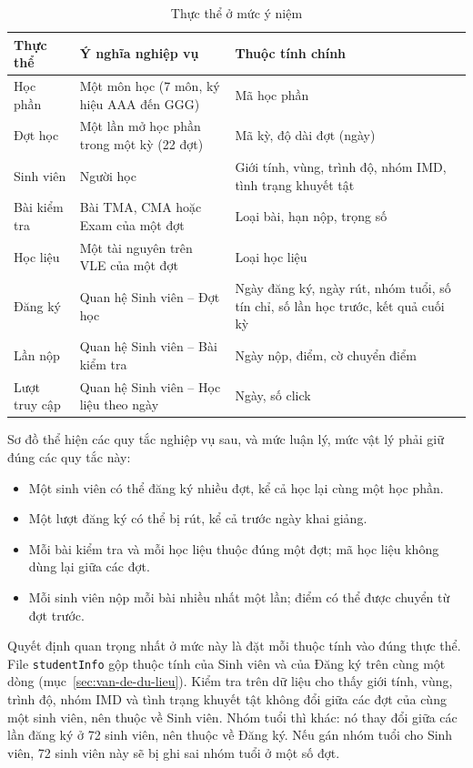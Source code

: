 \begin{table}[htbp]
\centering
\small
\begin{tabularx}{\textwidth}{|p{2.4cm}|X|X|}
\hline
\textbf{Thực thể} & \textbf{Ý nghĩa nghiệp vụ} & \textbf{Thuộc tính chính} \\ \hline
Học phần & Một môn học (7 môn, ký hiệu AAA đến GGG) & Mã học phần \\ \hline
Đợt học & Một lần mở học phần trong một kỳ (22 đợt) & Mã kỳ, độ dài đợt (ngày) \\ \hline
Sinh viên & Người học & Giới tính, vùng, trình độ, nhóm IMD, tình trạng khuyết tật \\ \hline
Bài kiểm tra & Bài TMA, CMA hoặc Exam của một đợt & Loại bài, hạn nộp, trọng số \\ \hline
Học liệu & Một tài nguyên trên VLE của một đợt & Loại học liệu \\ \hline
Đăng ký & Quan hệ Sinh viên -- Đợt học & Ngày đăng ký, ngày rút, nhóm tuổi, số tín chỉ, số lần học trước, kết quả cuối kỳ \\ \hline
Lần nộp & Quan hệ Sinh viên -- Bài kiểm tra & Ngày nộp, điểm, cờ chuyển điểm \\ \hline
Lượt truy cập & Quan hệ Sinh viên -- Học liệu theo ngày & Ngày, số click \\ \hline
\end{tabularx}
\caption{Thực thể ở mức ý niệm}
\label{tab:thuc-the}
\end{table}

Sơ đồ thể hiện các quy tắc nghiệp vụ sau, và mức luận lý, mức vật lý phải giữ đúng các quy tắc này:
\begin{itemize}
  \item Một sinh viên có thể đăng ký nhiều đợt, kể cả học lại cùng một học phần.
  \item Một lượt đăng ký có thể bị rút, kể cả trước ngày khai giảng.
  \item Mỗi bài kiểm tra và mỗi học liệu thuộc đúng một đợt; mã học liệu không dùng lại giữa
        các đợt.
  \item Mỗi sinh viên nộp mỗi bài nhiều nhất một lần; điểm có thể được chuyển từ đợt trước.
\end{itemize}

Quyết định quan trọng nhất ở mức này là đặt mỗi thuộc tính vào đúng thực thể. File
\texttt{studentInfo} gộp thuộc tính của Sinh viên và của Đăng ký trên cùng một dòng (mục~\ref{sec:van-de-du-lieu}). Kiểm tra trên dữ liệu cho thấy giới tính, vùng, trình độ, nhóm IMD và tình trạng khuyết tật không đổi giữa các đợt của cùng một sinh viên, nên thuộc về Sinh viên. Nhóm tuổi thì khác: nó thay đổi giữa các lần đăng ký ở 72 sinh viên, nên thuộc về Đăng ký. Nếu gán nhóm tuổi cho Sinh viên, 72 sinh viên này sẽ bị ghi sai nhóm tuổi ở một số đợt.


